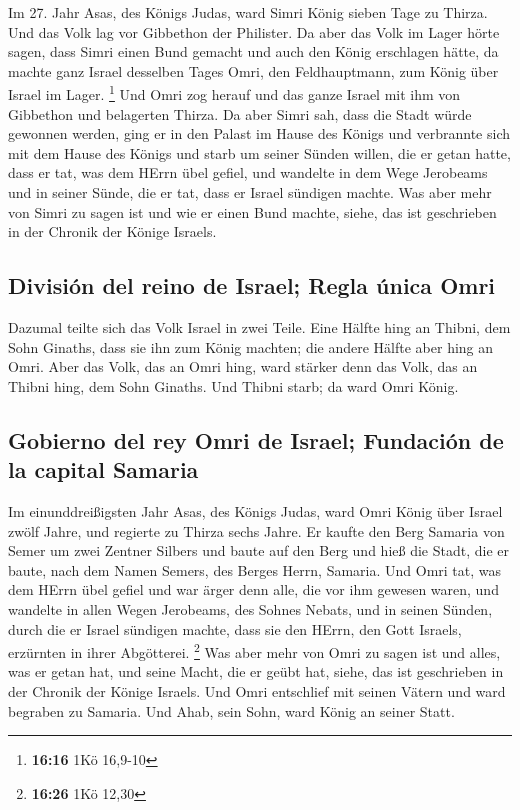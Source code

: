  Im 27. Jahr Asas, des Königs Judas, ward Simri König
sieben Tage zu Thirza. Und das Volk lag vor Gibbethon der Philister.
 Da aber das Volk im Lager hörte sagen, dass Simri einen
Bund gemacht und auch den König erschlagen hätte, da machte ganz Israel
desselben Tages Omri, den Feldhauptmann, zum König über Israel im Lager.
\footnote{\textbf{16:16} 1Kö 16,9-10}  Und Omri zog
herauf und das ganze Israel mit ihm von Gibbethon und belagerten Thirza.
 Da aber Simri sah, dass die Stadt würde gewonnen werden,
ging er in den Palast im Hause des Königs und verbrannte sich mit dem
Hause des Königs und starb  um seiner Sünden willen, die
er getan hatte, dass er tat, was dem HErrn übel gefiel, und wandelte in
dem Wege Jerobeams und in seiner Sünde, die er tat, dass er Israel
sündigen machte.  Was aber mehr von Simri zu sagen ist
und wie er einen Bund machte, siehe, das ist geschrieben in der Chronik
der Könige Israels.

\hypertarget{divisiuxf3n-del-reino-de-israel-regla-uxfanica-omri}{%
\subsection{División del reino de Israel; Regla única
Omri}\label{divisiuxf3n-del-reino-de-israel-regla-uxfanica-omri}}

 Dazumal teilte sich das Volk Israel in zwei Teile. Eine
Hälfte hing an Thibni, dem Sohn Ginaths, dass sie ihn zum König machten;
die andere Hälfte aber hing an Omri.  Aber das Volk, das
an Omri hing, ward stärker denn das Volk, das an Thibni hing, dem Sohn
Ginaths. Und Thibni starb; da ward Omri König.

\hypertarget{gobierno-del-rey-omri-de-israel-fundaciuxf3n-de-la-capital-samaria}{%
\subsection{Gobierno del rey Omri de Israel; Fundación de la capital
Samaria}\label{gobierno-del-rey-omri-de-israel-fundaciuxf3n-de-la-capital-samaria}}

 Im einunddreißigsten Jahr Asas, des Königs Judas, ward
Omri König über Israel zwölf Jahre, und regierte zu Thirza sechs Jahre.
 Er kaufte den Berg Samaria von Semer um zwei Zentner
Silbers und baute auf den Berg und hieß die Stadt, die er baute, nach
dem Namen Semers, des Berges Herrn, Samaria.  Und Omri
tat, was dem HErrn übel gefiel und war ärger denn alle, die vor ihm
gewesen waren,  und wandelte in allen Wegen Jerobeams,
des Sohnes Nebats, und in seinen Sünden, durch die er Israel sündigen
machte, dass sie den HErrn, den Gott Israels, erzürnten in ihrer
Abgötterei. \footnote{\textbf{16:26} 1Kö 12,30}  Was aber
mehr von Omri zu sagen ist und alles, was er getan hat, und seine Macht,
die er geübt hat, siehe, das ist geschrieben in der Chronik der Könige
Israels.  Und Omri entschlief mit seinen Vätern und ward
begraben zu Samaria. Und Ahab, sein Sohn, ward König an seiner Statt.

